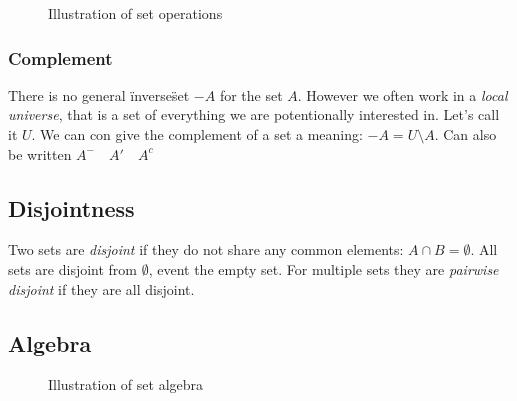 \documentclass[12pt]{article} %
\begin{document}
\begin{figure}[H]
\caption{Illustration of set operations}
\label{operations}
\end{figure}

\subsubsection{Complement}
There is no general \"inverse\" set $-A$ for the set $A$. However we often work in a \textit{local universe}, that is a set of everything we are potentionally interested in. Let's call it $U$. We can con give the complement of a set a meaning: $-A = U \setminus A$. Can also be written $A^- \quad A' \quad A^c$

\subsection{Disjointness}
Two sets are \textit{disjoint} if they do not share any common elements: $A \cap B = \emptyset$. All sets are disjoint from $\emptyset$, event the empty set. For multiple sets they are \textit{pairwise disjoint} if they are all disjoint.

\subsection{Algebra}

\begin{figure}[H]
\caption{Illustration of set algebra}
\label{set algebra}
\end{figure}
\end{document}
